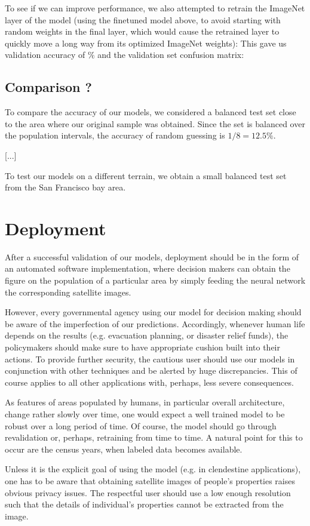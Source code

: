 \documentclass{article}
\begin{document}
To see if we can improve performance, we also attempted to retrain the ImageNet layer of the model (using the finetuned model above, to avoid starting with random weights in the final layer, which would cause the retrained layer to quickly move a long way from its optimized ImageNet weights): This gave us  validation accuracy of $\%$ and the validation set confusion matrix:

\subsection{Comparison ?}
To compare the accuracy of our models, we considered a balanced test set close to the area where our original sample was obtained. Since the set is balanced over the population intervals, the accuracy of random guessing is $1/8=12.5\%$.

[...]

To test our models on a different terrain, we obtain a small balanced test set from the San Francisco bay area.

\section{Deployment}
After a successful validation of our models, deployment should be in the form of an automated software implementation, where decision makers can obtain the figure on the population of a particular area by simply feeding the neural network the corresponding satellite images.

However, every governmental agency using our model for decision making should be aware of the imperfection of our predictions. Accordingly, whenever human life depends on the results (e.g. evacuation planning, or disaster relief funds), the policymakers should make sure to have appropriate cushion built into their actions. To provide further security, the cautious user should use our models in conjunction with other techniques and be alerted by huge discrepancies. This of course applies to all other applications with, perhaps, less severe consequences.

As features of areas populated by humans, in particular overall architecture, change rather slowly over time, one would expect a well trained model to be robust over a long period of time. Of course, the model should go through revalidation or, perhaps, retraining from time to time. A natural point for this to occur are the census years, when labeled data becomes available.

Unless it is the explicit goal of using the model (e.g. in clendestine applications), one has to be aware that obtaining satellite images of people's properties raises obvious privacy issues. The respectful user should use a low enough resolution such that the details of individual's properties cannot be extracted from the image.
\end{document}
